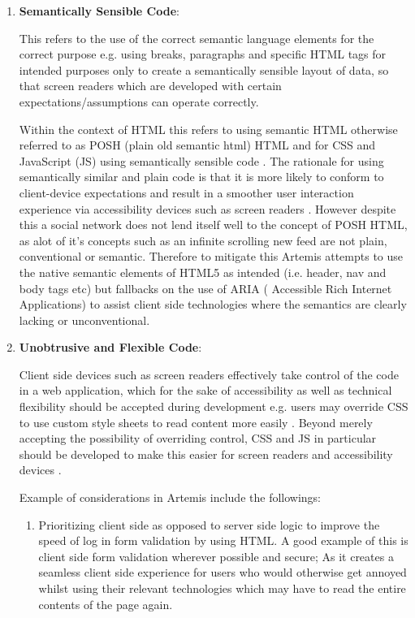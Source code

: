 \begin{enumerate}
    \item \textbf{Semantically Sensible Code}:
    
    This refers to the use of the correct semantic language elements for the correct purpose e.g. using breaks, paragraphs and specific HTML tags for intended purposes only \cite{Mills,Mills2017} to create a semantically sensible layout of data, so that screen readers which are developed with certain expectations/assumptions can operate correctly.
    
    Within the context of HTML this refers to using semantic HTML otherwise referred to as POSH (plain old semantic html) HTML \cite{Mills2017} and for CSS and JavaScript (JS) using semantically sensible code \cite{Mills}. The rationale for using semantically similar and plain code is that it is more likely to conform to client-device expectations and result in a smoother user interaction experience via accessibility devices such as screen readers \cite{Mills2017,Mills}. However despite this a social network does not lend itself well to the concept of POSH HTML, as alot of it's concepts such as an infinite scrolling new feed are not plain, conventional or semantic. Therefore to mitigate this Artemis attempts to use the native semantic elements of HTML5 as intended (i.e. header, nav and body tags etc) but fallbacks on the use of ARIA ( Accessible Rich Internet Applications) to assist client side technologies where the semantics are clearly lacking or unconventional.
    
    \item \textbf{Unobtrusive and Flexible Code}:
    
    Client side devices such as screen readers effectively take control of the code in a web application, which for the sake of accessibility as well as technical flexibility should be accepted during development e.g. users may override CSS to use custom style sheets to read content more easily \cite{Mills}. Beyond merely accepting the possibility of overriding control, CSS and JS in particular should be developed to make this easier for screen readers and accessibility devices \cite{Mills,Mills2017,Sukardi2016}.
    
    Example of considerations in Artemis include the followings:
    \begin{enumerate}
        \item Prioritizing client side as opposed to server side logic to improve the speed of log in form validation by using  HTML. A good example of this is client side form validation wherever possible and secure; As it creates a seamless client side experience for users who would otherwise get annoyed whilst using their relevant technologies which may have to read the entire contents of the page again.
        

\end{enumerate}
\end{enumerate}
